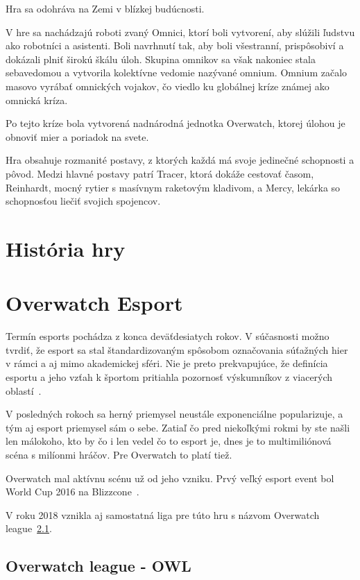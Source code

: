 \documentclass[10pt,oneside,slovak,a4paper]{article}
\begin{document}
Hra sa odohráva na Zemi v blízkej budúcnosti. 

V hre sa nachádzajú roboti zvaný Omnici, ktorí boli vytvorení, aby slúžili ľudstvu ako robotníci a asistenti. Boli navrhnutí tak, aby boli všestranní, prispôsobiví a dokázali plniť širokú škálu úloh. Skupina omnikov sa však nakoniec stala sebavedomou a vytvorila kolektívne vedomie nazývané omnium. Omnium začalo masovo vyrábať omnických vojakov, čo viedlo ku globálnej kríze známej ako omnická kríza.

Po tejto kríze bola vytvorená nadnárodná jednotka Overwatch, ktorej úlohou je obnoviť mier a poriadok na svete.

Hra obsahuje rozmanité postavy, z ktorých každá má svoje jedinečné schopnosti a pôvod. Medzi hlavné postavy patrí Tracer, ktorá dokáže cestovať časom, Reinhardt, mocný rytier s masívnym raketovým kladivom, a Mercy, lekárka so schopnosťou liečiť svojich spojencov. 


\section{História hry} \label{História hry}


\section{Overwatch Esport} \label{Overwatch Esport}

Termín esports pochádza z konca deväťdesiatych rokov. V súčasnosti možno tvrdiť, že esport sa stal štandardizovaným spôsobom označovania súťažných hier v rámci a aj mimo akademickej sféri. Nie je preto prekvapujúce, že definícia esportu a jeho vzťah k športom pritiahla pozornosť výskumníkov z viacerých oblastí~\cite{Overwatchesport}.

V posledných rokoch sa herný priemysel neustále exponenciálne popularizuje, a tým aj esport priemysel sám o sebe. Zatiaľ čo pred niekoľkými rokmi by ste 
našli len málokoho, kto by čo i len vedel čo to esport je, dnes je to multimiliónová scéna s milíonmi hráčov. Pre Overwatch to platí tiež.

Overwatch mal aktívnu scénu už od jeho vzniku. Prvý veľký esport event bol World Cup 2016 na Blizzcone~\cite{Overwatchesport}.

V roku 2018 vznikla aj samostatná liga pre túto hru s názvom Overwatch league~\ref{Overwatch league - OWL}.

\subsection{Overwatch league - OWL} \label{Overwatch league - OWL}
\end{document}
